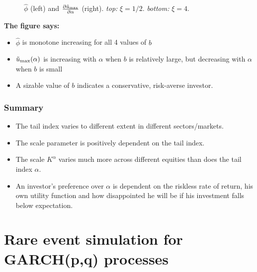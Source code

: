 \documentclass{beamer}
\begin{document}
\begin{frame}
\begin{minipage}[t]{0.5\linewidth}
\begin{figure}[htb!]
\begin{minipage}{0.5\linewidth}
      \end{minipage}
      \caption{$\hat\phi$ (left) and
        ${\partial \tilde u_{\rm max} \over \partial \alpha}$ (right).
        {\em top:} $\xi = 1/2$. {\em bottom:} $\xi = 4$.
      }
      \label{fig:htfg}
    \end{figure}
  \end{minipage}\hfill
  \begin{minipage}[t]{0.5\linewidth}
    \textcolor[HTML]{990033}{\bf The figure says:}
    \begin{itemize}
    \item  $\hat\phi$ is monotone increasing for all 4 values of $b$
    \item $\tilde u_{\rm max}(\alpha)$ is increasing with $\alpha$
      when $b$ is relatively large, but  decreasing with $\alpha$ when
      $b$ is small
    \item A sizable value of $b$ indicates a conservative, risk-averse investor.
    \end{itemize}
  \end{minipage}
\end{frame}

\begin{frame}
  \frametitle{Summary}
  \begin{itemize}
  \item The tail index varies to different extent in different
    sectors/markets.
  \item The scale parameter is positively dependent on the tail index.
  \item The scale $K^{\alpha}$ varies much more across different
    equities than does the tail index $\alpha$.
  \item An investor's preference over $\alpha$ is dependent on the
    riskless rate of return, his own utility function and how
    disappointed he will be if his investment falls below
    expectation.
  \end{itemize}
\end{frame}

\section{Rare event simulation for GARCH(p,q) processes}
\end{document}
